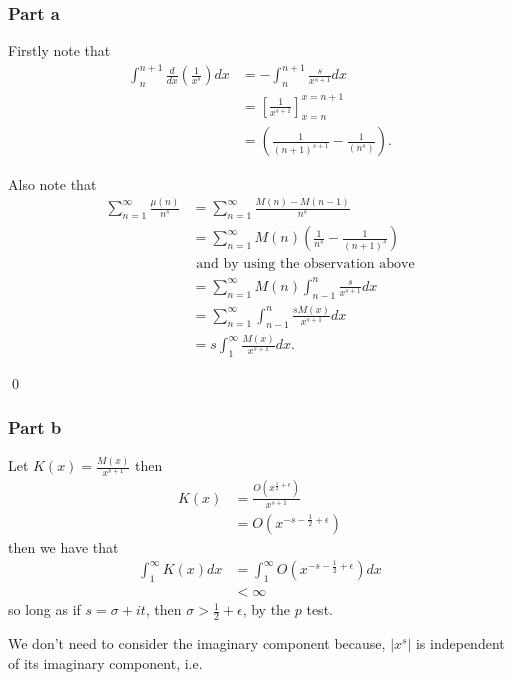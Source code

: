 \documentclass{unswmaths}
\begin{document}
\subsubsection*{Part a}

Firstly note that
\begin{align*}
	\int_{n}^{n+1} \frac{d}{dx}\left( \frac{1}{x^s} \right) dx &= -\int_{n}^{n+1}\frac{s}{x^{s+1}}dx \\
		&= \left[ \frac{1}{x^{s+1}} \right]_{x = n}^{x=n+1} \\
		&= \left( \frac{1}{(n+1)^{s+1}} - \frac{1}{(n^s)} \right).
\end{align*}

Also note that
\begin{align*}
	\sum_{n=1}^\infty \frac{\mu(n)}{n^s} &= \sum_{n=1}^\infty \frac{M(n) - M(n-1)}{n^s} \\
		&= \sum_{n=1}^\infty M(n) \left( \frac{1}{n^s} - \frac{1}{(n+1)^s} \right) \\
		& \text{ and by using the observation above} \\
		&= \sum_{n=1}^\infty M(n) \int_{n-1}^n \frac{s}{x^{s+1}} dx \\
		&= \sum_{n=1}^\infty \int_{n-1}^n \frac{s M(x)}{x^{s+1}} dx \\
		&= s \int_1^\infty\frac{M(x)}{x^{s+1}} dx.
\end{align*}

\qed

\subsubsection*{Part b}

Let $ K(x) = \frac{M(x)}{x^{s+1}} $ then
\begin{align*}
	K(x) &= \frac{O(x^{\frac{1}{2} + \epsilon})}{x^{s+1}} \\
		&= O(x^{-s-\frac{1}{2} + \epsilon})
\end{align*}
then we have that 
\begin{align*}
	\int_1^\infty K(x) dx &= \int_1^\infty O(x^{-s-\frac{1}{2} + \epsilon}) dx \\
		&< \infty
\end{align*}
so long as if $ s = \sigma + it $, then $ \sigma > \frac{1}{2} + \epsilon $, by the $ p $ test.



We don't need to consider the imaginary component because, $| x^s | $ is independent
of its imaginary component, i.e. 
\end{document}
